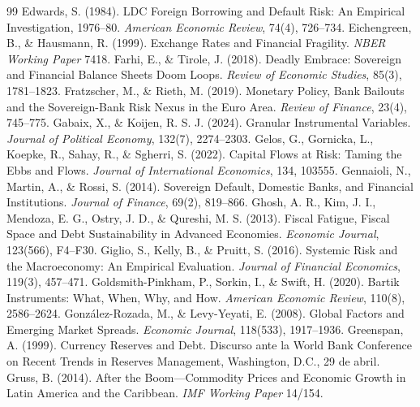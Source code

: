 \begin{thebibliography}{99}
 Edwards, S. (1984). LDC Foreign Borrowing and Default Risk: An Empirical Investigation, 1976--80. \textit{American Economic Review}, 74(4), 726--734.
 Eichengreen, B., \& Hausmann, R. (1999). Exchange Rates and Financial Fragility. \textit{NBER Working Paper} 7418.
 Farhi, E., \& Tirole, J. (2018). Deadly Embrace: Sovereign and Financial Balance Sheets Doom Loops. \textit{Review of Economic Studies}, 85(3), 1781--1823.
 Fratzscher, M., \& Rieth, M. (2019). Monetary Policy, Bank Bailouts and the Sovereign-Bank Risk Nexus in the Euro Area. \textit{Review of Finance}, 23(4), 745--775.
 Gabaix, X., \& Koijen, R. S. J. (2024). Granular Instrumental Variables. \textit{Journal of Political Economy}, 132(7), 2274--2303.
 Gelos, G., Gornicka, L., Koepke, R., Sahay, R., \& Sgherri, S. (2022). Capital Flows at Risk: Taming the Ebbs and Flows. \textit{Journal of International Economics}, 134, 103555.
 Gennaioli, N., Martin, A., \& Rossi, S. (2014). Sovereign Default, Domestic Banks, and Financial Institutions. \textit{Journal of Finance}, 69(2), 819--866.
 Ghosh, A. R., Kim, J. I., Mendoza, E. G., Ostry, J. D., \& Qureshi, M. S. (2013). Fiscal Fatigue, Fiscal Space and Debt Sustainability in Advanced Economies. \textit{Economic Journal}, 123(566), F4--F30.
 Giglio, S., Kelly, B., \& Pruitt, S. (2016). Systemic Risk and the Macroeconomy: An Empirical Evaluation. \textit{Journal of Financial Economics}, 119(3), 457--471.
 Goldsmith-Pinkham, P., Sorkin, I., \& Swift, H. (2020). Bartik Instruments: What, When, Why, and How. \textit{American Economic Review}, 110(8), 2586--2624.
 González-Rozada, M., \& Levy-Yeyati, E. (2008). Global Factors and Emerging Market Spreads. \textit{Economic Journal}, 118(533), 1917--1936.
 Greenspan, A. (1999). Currency Reserves and Debt. Discurso ante la World Bank Conference on Recent Trends in Reserves Management, Washington, D.C., 29 de abril.
 Gruss, B. (2014). After the Boom---Commodity Prices and Economic Growth in Latin America and the Caribbean. \textit{IMF Working Paper} 14/154.

\end{thebibliography}
